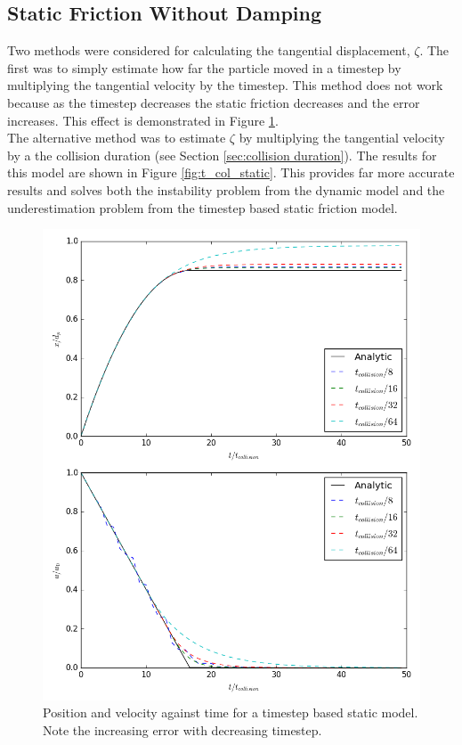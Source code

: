 \documentclass[10pt,a4paper,titlepage]{report}
\begin{document}
\subsection{Static Friction Without Damping}
Two methods were considered for calculating the tangential displacement, $\zeta$. The first was to simply estimate how far the particle moved in a timestep by multiplying the tangential velocity by the timestep. This method does not work because as the timestep decreases the static friction decreases and the error increases. This effect is demonstrated in Figure \ref{fig:delta_t_static}.
\\The alternative method was to estimate $\zeta$ by multiplying the tangential velocity by a the collision duration (see Section \ref{sec:collision duration}). The results for this model are shown in Figure \ref{fig:t_col_static}. This provides far more accurate results and solves both the instability problem from the dynamic model and the underestimation problem from the timestep based static friction model.
\begin{figure}[!ht]
\centering
\includegraphics[scale=0.5]{figures/friction_model/delta_t_static.png}
\caption{Position and velocity against time for a timestep based static model. Note the increasing error with decreasing timestep.}
\label{fig:delta_t_static}
\end{figure}
\end{document}
